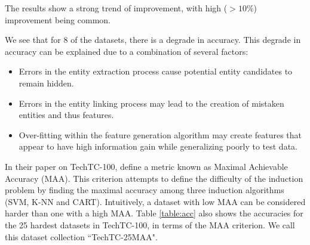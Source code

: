 \documentclass{article}
\theoremstyle{definition}
\begin{document}
The results show a strong trend of improvement, with high ($>10\%$) improvement being common.

We see that for 8 of the datasets, there is a degrade in accuracy. This degrade in accuracy can be explained due to a combination of several factors:
\begin{itemize}
	\item Errors in the entity extraction process cause potential entity candidates to remain hidden.%
	\item Errors in the entity linking process may lead to the creation of mistaken entities and thus features. %
	\item Over-fitting within the feature generation algorithm may create features that appear to have high information gain while generalizing poorly to test data.
\end{itemize} 

In their paper on TechTC-100, \cite{gabrilovich2004text} define a metric known as Maximal Achievable Accuracy (MAA). This criterion attempts to define the difficulty of the induction problem by finding the maximal accuracy among three induction algorithms (SVM, K-NN and CART).
Intuitively, a dataset with low MAA can be considered harder than one with a high MAA.%
Table \ref{table:acc} also shows the accuracies for the 25 hardest datasets in TechTC-100, in terms of the MAA criterion. We call this dataset collection ``TechTC-25MAA". %
\end{document}
